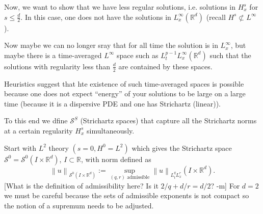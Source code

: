 \documentclass{article}
\def\purple{\color{Purple}}
\newcommand{\pnote}[1]{{\purple [#1]}} %
\def\R{\mathbb{R}} %
\newcommand\norm[1]{\left\lVert#1\right\rVert}
\begin{document}
Now, we want to show that we have less regular solutions, i.e. solutions in
$H_{x}^{s}$ for $s \leq \frac{d}{2}$. In this case, one does not have the
solutions in $L_{x}^{\infty}(\R^d)$ (recall $H^{s}\not\subset L^{\infty}$).

Now maybe we can no longer sray that for all time the solution is in
$L_{x}^{\infty}$, but maybe there is a time-averaged $L^{\infty}$ space such as
$L_{t}^{p-1}L_{x}^{\infty}(\R^d)$ such that the solutions with regularity less
than $\frac{d}{2}$ are contained by these spaces.

Heuristics suggest that hte existence of such time-averaged spaces is possible
because one does not expect ``energy'' of your solutions to be large on a large
time (because it is a dispersive PDE and one has Strichartz (linear)).

To this end we dfine $\mathcal{S}^{S}$ (Strichartz spaces) that capture all the
Strichartz norms at a certain regularity $H_{x}^{s}$ simultaneously.

Start with $L^{2}$ theory $(s=0,H^{0}=L^{2})$ which gives the Strichartz space
$\mathcal{S}^{0}=\mathcal{S}^{0}(I\times \R^d)$, $I\subset \R$, with norm defined as
\begin{equation*}
  \norm{u}_{\mathcal{S}^{0}(I\times \R^d)} := \sup_{(q,r) \text{ admissible}} \norm{u}_{L_{t}^{q}L_{x}^{r}}(I\times \R^d).
\end{equation*}
\pnote{What is the definition of admissibility here? Is it $2/q+d/r = d/2$? -m}
For $d=2$ we must be careful because the sets of admissible exponents is not
compact so the notion of a supremum needs to be adjusted.
\end{document}
